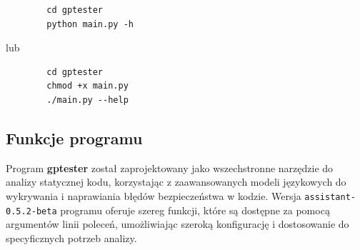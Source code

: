 \begin{listing}
    \begin{verbatim}
        cd gptester
        python main.py -h
    \end{verbatim}
\end{listing}
lub 
\begin{listing}
    \begin{verbatim}
        cd gptester
        chmod +x main.py
        ./main.py --help
    \end{verbatim}
\end{listing}



\subsection{Funkcje programu}

Program \textbf{gptester} został zaprojektowany jako wszechstronne narzędzie do analizy statycznej kodu, korzystając z zaawansowanych modeli językowych do wykrywania i naprawiania błędów bezpieczeństwa w kodzie. Wersja \texttt{assistant-0.5.2-beta} programu oferuje szereg funkcji, które są dostępne za pomocą argumentów linii poleceń, umożliwiając szeroką konfigurację i dostosowanie do specyficznych potrzeb analizy.

